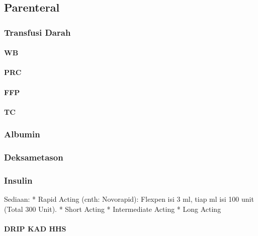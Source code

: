 \documentclass[
]{book}
\begin{document}
\hypertarget{parenteral}{%
\subsection{Parenteral}\label{parenteral}}

\hypertarget{transfusi-darah}{%
\subsubsection{Transfusi Darah}\label{transfusi-darah}}

\hypertarget{wb}{%
\paragraph{WB}\label{wb}}

\hypertarget{prc}{%
\paragraph{PRC}\label{prc}}

\hypertarget{ffp}{%
\paragraph{FFP}\label{ffp}}

\hypertarget{tc}{%
\paragraph{TC}\label{tc}}

\hypertarget{albumin}{%
\subsubsection{Albumin}\label{albumin}}

\hypertarget{deksametason}{%
\subsubsection{Deksametason}\label{deksametason}}

\hypertarget{insulin}{%
\subsubsection{Insulin}\label{insulin}}

Sediaan:
* Rapid Acting (cnth: Novorapid): Flexpen isi 3 ml, tiap ml isi 100 unit (Total 300 Unit).
* Short Acting
* Intermediate Acting
* Long Acting

\hypertarget{drip-kad-hhs}{%
\paragraph{DRIP KAD HHS}\label{drip-kad-hhs}}
\end{document}
